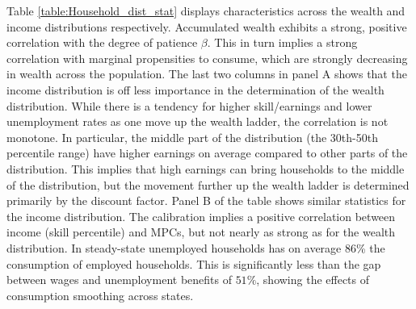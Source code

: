 Table \ref{table:Household_dist_stat} displays characteristics across the wealth and income distributions respectively. Accumulated wealth exhibits a strong, positive correlation with the degree of patience $\beta$. This in turn implies a strong correlation with marginal propensities to consume, which are strongly decreasing in wealth across the population. The last two columns in panel A shows that the income distribution is off less importance in the determination of the wealth distribution. While there is a tendency for higher skill/earnings and lower unemployment rates as one move up the wealth ladder, the correlation is not monotone. In particular, the middle part of the distribution (the 30th-50th percentile range) have higher earnings on average compared to other parts of the distribution. This implies that high earnings can bring households to the middle of the distribution, but the movement further up the wealth ladder is determined primarily by the discount factor.
Panel B of the table shows similar statistics for the income distribution. The calibration implies a positive correlation between income (skill percentile) and MPCs, but not nearly as strong as for the wealth distribution. 
In steady-state unemployed households has on average 86\% the consumption of employed households. This is significantly less than the gap between wages and unemployment benefits of $51\%$, showing the effects of consumption smoothing across states.   


